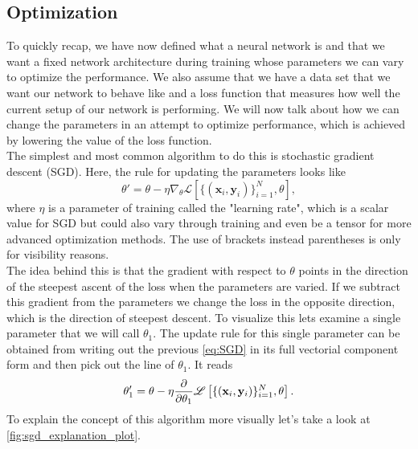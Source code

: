 \subsection{Optimization}
To quickly recap, we have now defined what a neural network is and that we want a fixed network architecture during training whose parameters we can vary to optimize the performance. We also assume that we have a data set that we want our network to behave like and a loss function that measures how well the current setup of our network is performing. We will now talk about how we can change the parameters in an attempt to optimize performance, which is achieved by lowering the value of the loss function.\\
The simplest and most common algorithm to do this is stochastic gradient descent (SGD). Here, the rule for updating the parameters looks like 
\begin{equation}\label{eq:SGD}
	\theta' = \theta - \eta \nabla_\theta \mathscr{L}\left[ \{(\mathbf{x}_i, \mathbf{y}_i)\}_{i=1}^{N}, \theta \right],
\end{equation}
where $\eta$ is a parameter of training called the "learning rate", which is a scalar value for SGD but could also vary through training and even be a tensor for more advanced optimization methods. The use of brackets instead parentheses is only for visibility reasons.\\
The idea behind this is that the gradient with respect to $\theta$ points in the direction of the steepest ascent of the loss when the parameters are varied. If we subtract this gradient from the parameters we change the loss in the opposite direction, which is the direction of steepest descent. To visualize this lets examine a single parameter that we will call $\theta_1$. The update rule for this single parameter can be obtained from writing out the previous \cref{eq:SGD} in its full vectorial component form and then pick out the line of $\theta_1$. It reads
\begin{equation}
	\theta_1' = \theta - \eta \frac{\partial}{\partial\theta_1} \mathscr{L}\left[ \{(\mathbf{x}_i, \mathbf{y}_i)\}_{i=1}^{N}, \theta \right].
\end{equation}
To explain the concept of this algorithm more visually let's take a look at \cref{fig:sgd_explanation_plot}. 
